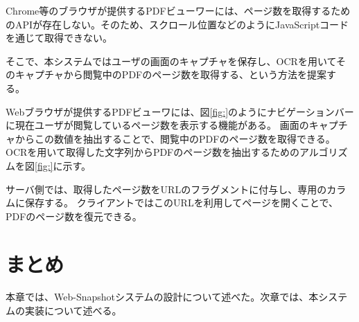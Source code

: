 Chrome等のブラウザが提供するPDFビューワーには、ページ数を取得するためのAPIが存在しない。そのため、スクロール位置などのようにJavaScriptコードを通じて取得できない。

そこで、本システムではユーザの画面のキャプチャを保存し、OCRを用いてそのキャプチャから閲覧中のPDFのページ数を取得する、という方法を提案する。

Webブラウザが提供するPDFビューワには、図\ref{fig:}のようにナビゲーションバーに現在ユーザが閲覧しているページ数を表示する機能がある。
画面のキャプチャからこの数値を抽出することで、閲覧中のPDFのページ数を取得できる。
OCRを用いて取得した文字列からPDFのページ数を抽出するためのアルゴリズムを図\ref{fig:}に示す。

サーバ側では、取得したページ数をURLのフラグメントに付与し、専用のカラムに保存する。
クライアントではこのURLを利用してページを開くことで、PDFのページ数を復元できる。

\section{まとめ}
本章では、Web-Snapshotシステムの設計について述べた。次章では、本システムの実装について述べる。
